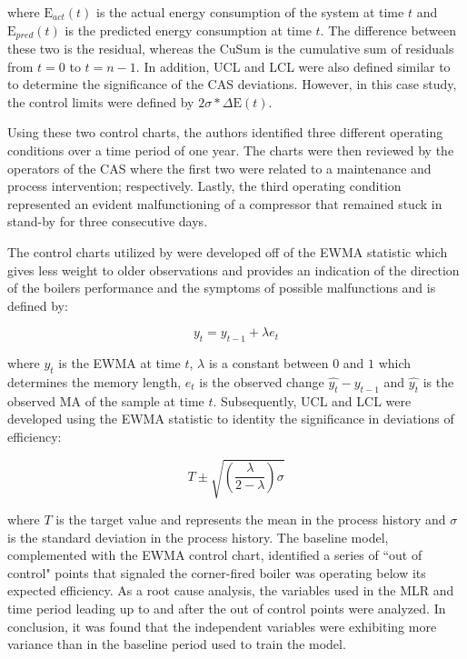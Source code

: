 where $\text{E}_{act}(t)$ is the actual energy consumption of the system at time $t$ and $\text{E}_{pred}(t)$ is the predicted energy consumption at time $t$. The difference between these two is the residual, whereas the CuSum is the cumulative sum of residuals from $t=0$ to $t=n-1$. In addition, UCL and LCL were also defined similar to \cite{tightening} to determine the significance of the CAS deviations. However, in this case study, the control limits were defined by $2 \sigma * \Delta \text{E}(t)$. 

Using these two control charts, the authors identified three different operating conditions over a time period of one year. The charts were then reviewed by the operators of the CAS where the first two were related to a maintenance and process intervention; respectively. Lastly, the third operating condition represented an evident malfunctioning of a compressor that remained stuck in stand-by for three consecutive days.

The control charts utilized by \cite{boiler} were developed off of the \ac{EWMA} statistic which gives less weight to older observations and provides an indication of the direction of the boilers performance and the symptoms of possible malfunctions and is defined by:

\begin{equation}
    y_t = y_{t-1} + \lambda e_t
\end{equation}

where $y_t$ is the EWMA at time $t$, $\lambda$ is a constant between $0$ and $1$ which determines the memory length, $e_t$ is the observed change $\hat{y_t} - y_{t-1}$ and $\hat{y_t}$ is the observed MA of the sample at time $t$. Subsequently, UCL and LCL were developed using the EWMA statistic to identity the significance in deviations of efficiency:

\begin{equation}
    T \pm \sqrt{(\frac{\lambda}{2 - \lambda})\sigma}
\end{equation}

where $T$ is the target value and represents the mean in the process history and $\sigma$ is the standard deviation in the process history. The baseline model, complemented with the EWMA control chart, identified a series of ``out of control" points that signaled the corner-fired boiler was operating below its expected efficiency. As a root cause analysis, the variables used in the MLR and time period leading up to and after the out of control points were analyzed. In conclusion, it was found that the independent variables were exhibiting more variance than in the baseline period used to train the model.